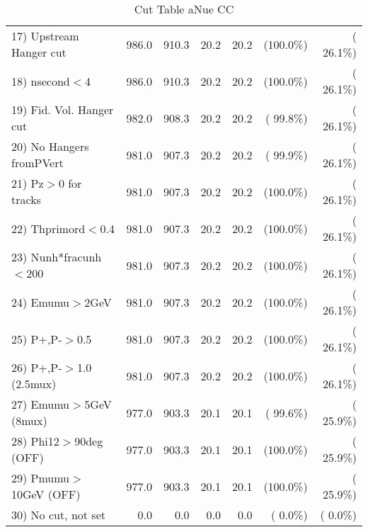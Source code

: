 \begin{table}[h!]
\begin{tabular}{||l||r|r|r|r|r|r||}
 17) Upstream Hanger cut  &        986.0 &        910.3 &         20.2 &         20.2 & (100.0\%) & ( 26.1\%) \\
 18) nsecond$<$4          &        986.0 &        910.3 &         20.2 &         20.2 & (100.0\%) & ( 26.1\%) \\
 19) Fid. Vol. Hanger cut &        982.0 &        908.3 &         20.2 &         20.2 & ( 99.8\%) & ( 26.1\%) \\
 20) No Hangers fromPVert &        981.0 &        907.3 &         20.2 &         20.2 & ( 99.9\%) & ( 26.1\%) \\
 21) Pz$>$0 for tracks    &        981.0 &        907.3 &         20.2 &         20.2 & (100.0\%) & ( 26.1\%) \\
 22) Thprimord$<$0.4      &        981.0 &        907.3 &         20.2 &         20.2 & (100.0\%) & ( 26.1\%) \\
 23) Nunh*fracunh$<$200   &        981.0 &        907.3 &         20.2 &         20.2 & (100.0\%) & ( 26.1\%) \\
 24) Emumu$>$2GeV         &        981.0 &        907.3 &         20.2 &         20.2 & (100.0\%) & ( 26.1\%) \\
 25) P+,P-$>$0.5          &        981.0 &        907.3 &         20.2 &         20.2 & (100.0\%) & ( 26.1\%) \\
 26) P+,P-$>$1.0 (2.5mux) &        981.0 &        907.3 &         20.2 &         20.2 & (100.0\%) & ( 26.1\%) \\
 27) Emumu$>$5GeV  (8mux) &        977.0 &        903.3 &         20.1 &         20.1 & ( 99.6\%) & ( 25.9\%) \\
 28) Phi12$>$90deg  (OFF) &        977.0 &        903.3 &         20.1 &         20.1 & (100.0\%) & ( 25.9\%) \\
 29) Pmumu$>$10GeV  (OFF) &        977.0 &        903.3 &         20.1 &         20.1 & (100.0\%) & ( 25.9\%) \\
 30) No cut, not set      &          0.0 &          0.0 &          0.0 &          0.0 & (  0.0\%) & (  0.0\%) \\
 \hline
 \hline
 \end{tabular}
 \caption{Cut Table  aNue CC  }
 \label{tab-cutheavy_neutrino_3.000}
 \end{table}
